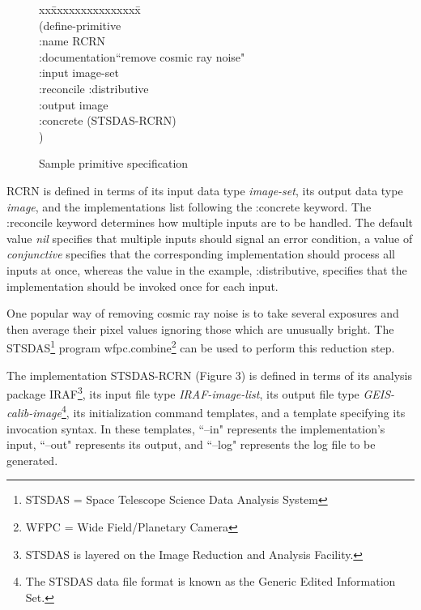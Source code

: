 \begin{figure}[hbt]
\caption{Sample primitive specification}
\begin{tabbing}
xx\=xxxxxxxxxxxxxxx\=\kill
\\
(define-primitive\\
	\>:name		\>RCRN\\
	\>:documentation\>``remove cosmic ray noise"\\
	\>:input	\>image-set\\
	\>:reconcile	\>:distributive\\
	\>:output	\>image\\
	\>:concrete	\>(STSDAS-RCRN)\\
)
\end{tabbing}
\end{figure}

RCRN is defined in terms of its input data type {\it image-set}, its output
data type {\it image}, and the implementations list following the :concrete
keyword.  The :reconcile keyword determines how multiple inputs are to be
handled.  The default value {\it nil} specifies that multiple inputs should
signal an error condition, a value of {\it conjunctive} specifies that the
corresponding implementation should process all inputs at once, whereas the
value in the example, :distributive, specifies that the implementation should
be invoked once for each input.

One popular way of removing cosmic ray noise is to take several exposures and
then average their pixel values ignoring those which are unusually bright.
The STSDAS\footnote{STSDAS = Space Telescope Science Data Analysis System}
program wfpc.combine\footnote{WFPC = Wide Field/Planetary Camera} can be used
to perform this reduction step.

The implementation STSDAS-RCRN (Figure 3) is defined in terms of its analysis
package IRAF\footnote{STSDAS is layered on the Image Reduction and Analysis
Facility.}, its input file type {\it IRAF-image-list}, its output file type
{\it GEIS-calib-image}\footnote{The STSDAS data file format is known as the
Generic Edited Information Set.}, its initialization command templates, and
a template specifying its invocation syntax.  In these templates, ``--in"
represents the implementation's input, ``--out" represents its output, and
``--log" represents the log file to be generated.

